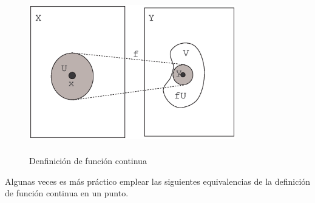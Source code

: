 \begin{figure}
\begin{center}
    \includegraphics[height=7cm, width=9cm]{funccon.eps}
    \caption{Denfinici\'on de funci\'on
    continua}\label{fig,funccon}
\end{center}
\end{figure}

Algunas veces es m\'as pr\'actico emplear las siguientes
equivalencias de la definici\'on de funci\'on continua en un
punto.

